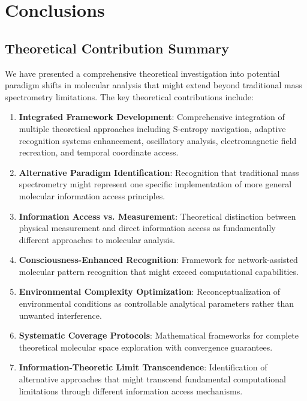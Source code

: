 \documentclass[11pt,a4paper]{article}
\theoremstyle{remark}
\begin{document}
\section{Conclusions}

\subsection{Theoretical Contribution Summary}

We have presented a comprehensive theoretical investigation into potential paradigm shifts in molecular analysis that might extend beyond traditional mass spectrometry limitations. The key theoretical contributions include:

\begin{enumerate}
\item \textbf{Integrated Framework Development}: Comprehensive integration of multiple theoretical approaches including S-entropy navigation, adaptive recognition systems enhancement, oscillatory analysis, electromagnetic field recreation, and temporal coordinate access.

\item \textbf{Alternative Paradigm Identification}: Recognition that traditional mass spectrometry might represent one specific implementation of more general molecular information access principles.

\item \textbf{Information Access vs. Measurement}: Theoretical distinction between physical measurement and direct information access as fundamentally different approaches to molecular analysis.

\item \textbf{Consciousness-Enhanced Recognition}: Framework for network-assisted molecular pattern recognition that might exceed computational capabilities.

\item \textbf{Environmental Complexity Optimization}: Reconceptualization of environmental conditions as controllable analytical parameters rather than unwanted interference.

\item \textbf{Systematic Coverage Protocols}: Mathematical frameworks for complete theoretical molecular space exploration with convergence guarantees.

\item \textbf{Information-Theoretic Limit Transcendence}: Identification of alternative approaches that might transcend fundamental computational limitations through different information access mechanisms.
\end{enumerate}
\end{document}
